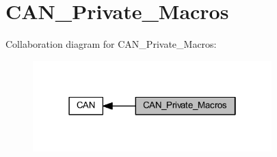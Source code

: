 \hypertarget{group___c_a_n___private___macros}{}\section{C\+A\+N\+\_\+\+Private\+\_\+\+Macros}
\label{group___c_a_n___private___macros}
Collaboration diagram for C\+A\+N\+\_\+\+Private\+\_\+\+Macros\+:
\nopagebreak
\begin{figure}[H]
\begin{center}
\leavevmode
\includegraphics[width=262pt]{group___c_a_n___private___macros}
\end{center}
\end{figure}
